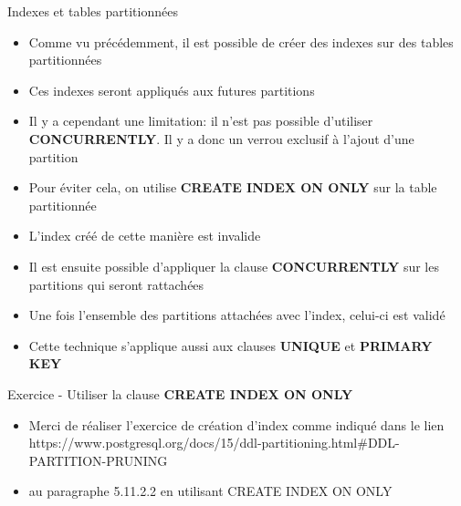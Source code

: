 
\begin{frame}[fragile]{Indexes et tables partitionnées}

   \begin{itemize}
      \item Comme vu précédemment, il est possible de créer des indexes sur des tables partitionnées
      \item Ces indexes seront appliqués aux futures partitions
      \item Il y a cependant une limitation: il n'est pas possible d'utiliser \textbf{CONCURRENTLY}. Il y a donc un verrou exclusif à l'ajout d'une partition
      \item Pour éviter cela, on utilise \textbf{CREATE INDEX ON ONLY} sur la table partitionnée
      \item L'index créé de cette manière est invalide
      \item Il est ensuite possible d'appliquer la clause \textbf{CONCURRENTLY} sur les partitions qui seront rattachées
      \item Une fois l'ensemble des partitions attachées avec l'index, celui-ci est validé
      \item Cette technique s'applique aussi aux clauses \textbf{UNIQUE} et \textbf{PRIMARY KEY}

   \end{itemize}

\end{frame}


\begin{frame}[fragile]{Exercice - Utiliser la clause \textbf{CREATE INDEX ON ONLY}}

   \begin{itemize}
      \item Merci de réaliser l'exercice de création d'index comme indiqué dans le lien https://www.postgresql.org/docs/15/ddl-partitioning.html\#DDL-PARTITION-PRUNING
      \item au paragraphe 5.11.2.2 en utilisant CREATE INDEX ON ONLY
   \end{itemize}

\end{frame}


